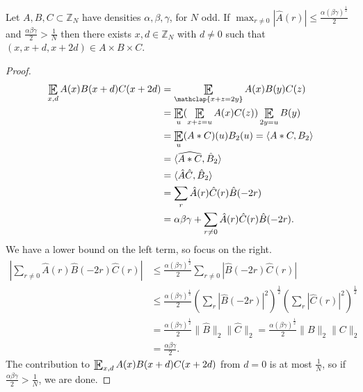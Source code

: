 \documentclass{article}
\DeclareMathOperator*{\E}{\scalerel*{\mathbb{E}}{\textstyle\sum}}
\newcommand{\1}[1]{\mathbbm{1}_{#1}}
\begin{document}
\begin{nlemma}\label{lem:1.5}
  Let $A, B, C \subset \mathbb{Z}_N$ have densities $\alpha, \beta, \gamma$, for $N$ odd.
  If $\max_{r \neq 0} |\hat{A}(r)| \leq \frac{\alpha(\beta \gamma)^\frac{1}{2}}{2}$ and $\frac{\alpha\beta\gamma}{2} > \frac{1}{N}$ then there exists $x,d \in \mathbb{Z}_N$ with $d \neq 0$ such that $(x, x+d, x+2d) \in A \times B \times C$.
\end{nlemma}
\begin{proof}
  \begin{align*}
    \E_{x,d} A(x) B(x+d) C(x+2d) &= \E_{\mathclap{x + z = 2y}} A(x) B(y) C(z) \\
                                 &= \E_u (\E_{x+z=u} A(x) C(z)) \E_{2y=u} B(y) \\
                                 &= \E_u (A * C)(u) B_2(u) = \langle A * C, B_2 \rangle \\
                                 &= \langle \widehat{A * C}, \hat{B} _2 \rangle \\
                                 &= \langle \hat{A} \hat{C}, \hat{B}_2 \rangle \\
                                 &= \sum_r \hat{A}(r) \hat{C}(r) \hat{B}(-2r) \\
                                 &= \alpha \beta \gamma + \sum_{r\neq 0} \hat{A}(r) \hat{C}(r) \hat{B}(-2r).
  \end{align*}
  We have a lower bound on the left term, so focus on the right.
  \begin{align*}
    \left| \sum_{r\neq0} \hat{A}(r) \hat{B}(-2r) \hat{C}(r) \right| &\leq \frac{\alpha(\beta\gamma)^\frac{1}{2}}{2} \sum_{r\neq0} |\hat{B}(-2r) \hat{C}(r)| \\
                                                      &\leq \frac{\alpha(\beta\gamma)^\frac{1}{2}}{2} \left(\sum_r |\hat{B}(-2r)|^2\right)^\frac{1}{2} \left(\sum_r |\hat{C}(r)|^2\right)^\frac{1}{2} \\
                                                      &= \frac{\alpha(\beta\gamma)^\frac{1}{2}}{2} \|\hat{B}\|_2 \|\hat{C}\|_2 = \frac{\alpha(\beta\gamma)^\frac{1}{2}}{2} \|B\|_2 \|C\|_2 \\
                                                      &= \frac{\alpha\beta\gamma}{2}.
  \end{align*}
  The contribution to $\E_{x,d} A(x) B(x+d) C(x+2d)$ from $d=0$ is at most $\frac{1}{N}$, so if $\frac{\alpha\beta\gamma}{2} > \frac{1}{N}$, we are done.
\end{proof}
\end{document}
